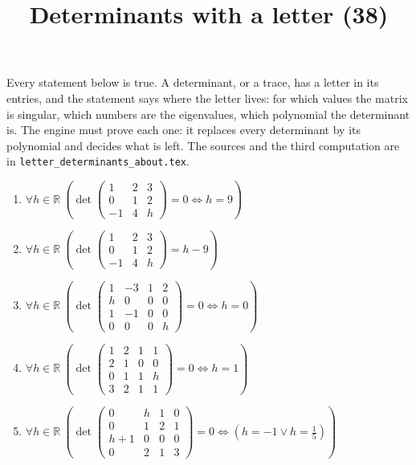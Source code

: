 \documentclass[11pt,a4paper]{article}
\title{Determinants with a letter (38)}
\author{}
\date{}
\begin{document}
\maketitle
Every statement below is true. A determinant, or a trace, has a letter in its entries, and the statement says where the letter lives: for which values the matrix is singular, which numbers are the eigenvalues, which polynomial the determinant is. The engine must prove each one: it replaces every determinant by its polynomial and decides what is left. The sources and the third computation are in \texttt{letter\_determinants\_about.tex}.

\begin{enumerate}
\item $\displaystyle \forall h \in \mathbb{R}\ \left( \det \begin{pmatrix} 1 & 2 & 3 \\ 0 & 1 & 2 \\ -1 & 4 & h \end{pmatrix} = 0 \iff h = 9 \right)$
\item $\displaystyle \forall h \in \mathbb{R}\ \left( \det \begin{pmatrix} 1 & 2 & 3 \\ 0 & 1 & 2 \\ -1 & 4 & h \end{pmatrix} = h - 9 \right)$
\item $\displaystyle \forall h \in \mathbb{R}\ \left( \det \begin{pmatrix} 1 & -3 & 1 & 2 \\ h & 0 & 0 & 0 \\ 1 & -1 & 0 & 0 \\ 0 & 0 & 0 & h \end{pmatrix} = 0 \iff h = 0 \right)$
\item $\displaystyle \forall h \in \mathbb{R}\ \left( \det \begin{pmatrix} 1 & 2 & 1 & 1 \\ 2 & 1 & 0 & 0 \\ 0 & 1 & 1 & h \\ 3 & 2 & 1 & 1 \end{pmatrix} = 0 \iff h = 1 \right)$
\item $\displaystyle \forall h \in \mathbb{R}\ \left( \det \begin{pmatrix} 0 & h & 1 & 0 \\ 0 & 1 & 2 & 1 \\ h + 1 & 0 & 0 & 0 \\ 0 & 2 & 1 & 3 \end{pmatrix} = 0 \iff \left( h = -1 \lor h = \frac{1}{5} \right) \right)$

\end{enumerate}
\end{document}
